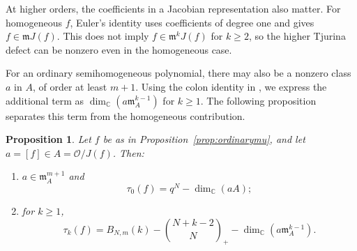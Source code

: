 \documentclass[12pt,reqno]{amsart}
\newcommand{\C}{\mathbb C}
\newcommand{\mm}{\mathfrak m}
\newcommand{\tbin}[2]{\binom{#1}{#2}_{\!+}}
\newcommand{\OO}{\mathcal O}
\newtheorem{proposition}[theorem]{Proposition}
\theoremstyle{definition}
\begin{document}
At higher orders, the coefficients in a Jacobian representation
also matter. For homogeneous $f$, Euler's identity uses coefficients
of degree one and gives $f\in\mm J(f)$. This does not imply
$f\in\mm^kJ(f)$ for $k\geq2$, so the higher Tjurina
defect can be nonzero even in the homogeneous case.

For an ordinary semihomogeneous polynomial, there may also be a
nonzero class $a$ in $A$, of order at least $m+1$.
Using the colon identity in
\cite[equation~(4.11)]{LiuYauZhang2026}, we express the additional term
as $\dim_\C(a\mm_A^{k-1})$ for $k\geq1$.
The following proposition separates this term from the homogeneous
contribution.


\begin{proposition}\label{prop:defect}
Let $f$ be as in Proposition~\ref{prop:ordinarymu}, and let $a=[f]\in A=\OO/J(f)$.
Then:
\begin{enumerate}
\item $a\in\mm_A^{m+1}$ and
\begin{equation}\label{eq:defect0}
 \tau_0(f)=q^N-\dim_\C(aA);
\end{equation}
\item for $k\geq1$,
\begin{equation}\label{eq:defectk}
 \tau_k(f)=B_{N,m}(k)-\tbin{N+k-2}{N}
                   -\dim_\C(a\mm_A^{k-1}).
\end{equation}
\end{enumerate}
\end{proposition}
\end{document}
